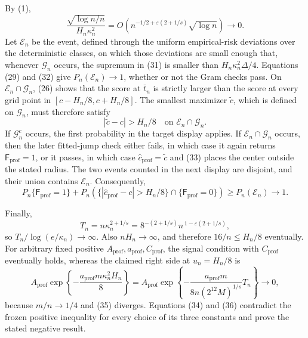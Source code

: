 By (1),
\[
 \frac{\sqrt{\log n/n}}{H_n\kappa_n^2}
 =O\!\left(n^{-1/2+\varepsilon(2+1/s)}\sqrt{\log n}\right)
 \longrightarrow0.
 \tag{32}
\]
Let \(\mathcal E_n\) be the event, defined through the uniform
empirical-risk deviations over the deterministic classes, on which
those deviations are small enough that, whenever \(\mathcal G_n\)
occurs, the supremum in (31) is smaller than
\(H_n\kappa_n^2\Delta/4\).  Equations (29) and (32) give
\(P_n(\mathcal E_n)\to1\), whether or not the Gram checks pass.  On
\(\mathcal E_n\cap\mathcal G_n\), (26) shows that the score at
\(\bar t_n\) is strictly larger than the score at every grid point in
\([c-H_n/8,c+H_n/8]\).  The smallest maximizer \(\widetilde c\), which
is defined on \(\mathcal G_n\), must therefore satisfy
\[
 |\widetilde c-c|>H_n/8
 \quad\text{on }\mathcal E_n\cap\mathcal G_n.
 \tag{33}
\]
If \(\mathcal G_n^c\) occurs, the first probability in the target
display applies.  If \(\mathcal E_n\cap\mathcal G_n\) occurs, then the
later fitted-jump check either fails, in which case it again returns
\(\mathsf F_{\mathrm{prof}}=1\), or it passes, in which case
\(\widehat c_{\mathrm{prof}}=\widetilde c\) and (33) places the center
outside the stated radius.  The two events counted in the next display
are disjoint, and their union contains \(\mathcal E_n\).  Consequently,
\[
 P_n\{\mathsf F_{\mathrm{prof}}=1\}
 +P_n\!\left(\{|\widehat c_{\mathrm{prof}}-c|>H_n/8\}
       \cap\{\mathsf F_{\mathrm{prof}}=0\}\right)
 \ge P_n(\mathcal E_n)\longrightarrow1.
 \tag{34}
\]

Finally,
\[
 T_n=n\kappa_n^{2+1/s}
 =8^{-(2+1/s)}n^{\,1-\varepsilon(2+1/s)},
 \tag{35}
\]
so \(T_n/\log(e/\kappa_n)\to\infty\).  Also
\(nH_n\to\infty\), and therefore \(16/n\le H_n/8\) eventually.  For
arbitrary fixed positive
\(A_{\mathrm{prof}},a_{\mathrm{prof}},C_{\mathrm{prof}}\), the signal
condition with \(C_{\mathrm{prof}}\) eventually holds, whereas the
claimed right side at \(u_n=H_n/8\) is
\[
 A_{\mathrm{prof}}
 \exp\left\{-\frac{a_{\mathrm{prof}}m\kappa_n^2H_n}{8}\right\}
 =A_{\mathrm{prof}}
 \exp\left\{-\frac{a_{\mathrm{prof}}m}{8n(2^{12}M)^{1/s}}T_n\right\}
 \longrightarrow0,
 \tag{36}
\]
because \(m/n\to1/4\) and (35) diverges.  Equations (34) and (36)
contradict the frozen positive inequality for every choice of its three
constants and prove the stated negative result.

